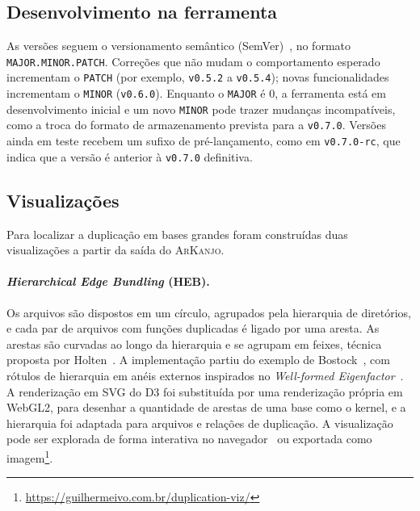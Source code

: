 \documentclass{article}
\newcommand{\ark}{\textsc{ArKanjo}}
\newcommand{\vnova}{\texttt{v0.7.0-rc}}
\begin{document}
\subsection{Desenvolvimento na ferramenta}

As versões seguem o versionamento semântico (SemVer)~\cite{semver}, no formato \texttt{MAJOR.\allowbreak MINOR\allowbreak.PATCH}. Correções que não mudam o comportamento esperado incrementam o \texttt{PATCH} (por exemplo, \texttt{v0.5.2} a \texttt{v0.5.4}); novas funcionalidades incrementam o \texttt{MINOR} (\texttt{v0.6.0}). Enquanto o \texttt{MAJOR} é 0, a ferramenta está em desenvolvimento inicial e um novo \texttt{MINOR} pode trazer mudanças incompatíveis, como a troca do formato de armazenamento prevista para a \texttt{v0.7.0}. Versões ainda em teste recebem um sufixo de pré-lançamento, como em \vnova{}, que indica que a versão é anterior à \texttt{v0.7.0} definitiva.

\subsection{Visualizações}
\label{sec:metviz}

Para localizar a duplicação em bases grandes foram construídas duas visualizações a partir da saída do \ark{}.

\paragraph{\textit{Hierarchical Edge Bundling} (HEB).} Os arquivos são dispostos em um círculo, agrupados pela hierarquia de diretórios, e cada par de arquivos com funções duplicadas é ligado por uma aresta. As arestas são curvadas ao longo da hierarquia e se agrupam em feixes, técnica proposta por Holten~\cite{holten2006heb}. A implementação partiu do exemplo de Bostock~\cite{bostock_heb}, com rótulos de hierarquia em anéis externos inspirados no \emph{Well-formed Eigenfactor}~\cite{stefaner2009eigenfactor}. A renderização em SVG do D3 foi substituída por uma renderização própria em WebGL2, para desenhar a quantidade de arestas de uma base como o kernel, e a hierarquia foi adaptada para arquivos e relações de duplicação. A visualização pode ser explorada de forma interativa no navegador~\cite{bozi2026duplicationviz} ou exportada como imagem\footnote{\url{https://guilhermeivo.com.br/duplication-viz/}}.
\end{document}

